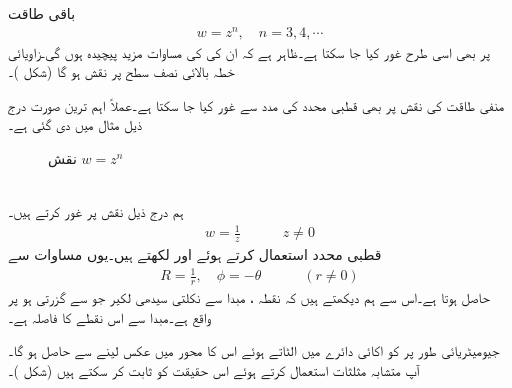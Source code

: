 باقی طاقت
\begin{align}
w=z^n,\quad n=3,4,\cdots
\end{align}
پر بھی اسی طرح غور کیا جا سکتا ہے۔ظاہر ہے کہ ان کی  کی مساوات مزید پیچیدہ ہوں گی۔زاویائی خطہ  بالائی نصف  سطح پر نقش ہو گا (شکل )۔

منفی طاقت کی نقش  پر بھی قطبی محدد کی مدد سے غور کیا جا سکتا ہے۔عملاً اہم ترین صورت درج ذیل مثال میں دی گئی ہے۔
\begin{figure}
\centering
\begin{subfigure}{0.30\textwidth}
\centering
{}
\end{subfigure}\hfill
\begin{subfigure}{0.60\textwidth}
\centering
{}
\end{subfigure}
\caption{نقش $w=z^n\,$}
\label{شکل_نقش_عمومی_طاقت}
\end{figure}

\quad {}\\
ہم درج ذیل نقش پر غور کرتے ہیں۔
\begin{align}\label{مساوات_نقش_الٹ_جانا_الف}
w=\frac{1}{z}\quad \quad \quad z\ne 0
\end{align}
قطبی محدد استعمال کرتے ہوئے  اور  لکھتے ہیں۔یوں مساوات  سے
\begin{align}
R=\frac{1}{r},\quad \phi=-\theta\quad \quad \quad (r\ne 0)
\end{align}
حاصل ہوتا ہے۔اس سے ہم دیکھتے ہیں کہ نقطہ ، مبدا سے نکلتی سیدھی لکیر جو  سے گزرتی ہو پر واقع ہے۔مبدا سے اس نقطے کا فاصلہ  ہے۔

جیومیٹریائی طور پر  کو اکائی دائرے میں الٹاتے ہوئے اس کا  محور میں عکس لینے سے   حاصل ہو گا۔آپ متشابہ مثلثات  استعمال کرتے ہوئے اس حقیقت کو ثابت کر سکتے ہیں (شکل  )۔

